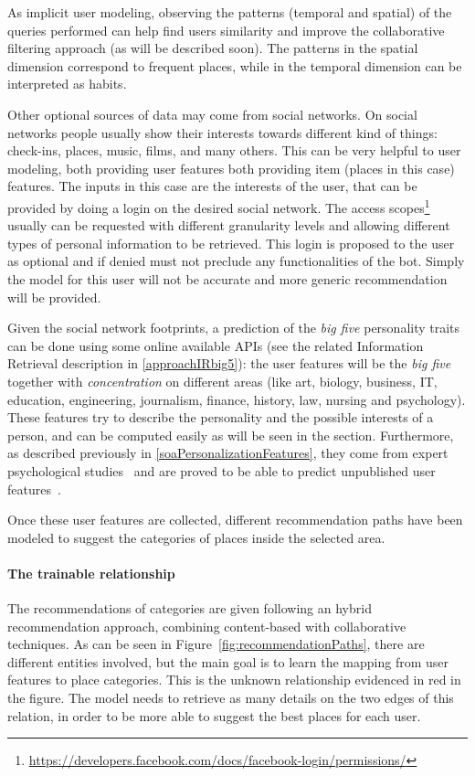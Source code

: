 As implicit user modeling, observing the patterns (temporal and spatial) of the queries performed can help find users similarity and improve the collaborative filtering approach (as will be described soon). The patterns in the spatial dimension correspond to frequent places, while in the temporal dimension can be interpreted as habits.

Other optional sources of data may come from social networks. On social networks people usually show their interests towards different kind of things: check-ins, places, music, films, and many others. This can be very helpful to user modeling, both providing user features both providing item (places in this case) features. The inputs in this case are the interests of the user, that can be provided by doing a login on the desired social network. The access scopes\footnote{\url{https://developers.facebook.com/docs/facebook-login/permissions/}} usually can be requested with different granularity levels and allowing different types of personal information to be retrieved. This login is proposed to the user as optional and if denied must not preclude any functionalities of the bot. Simply the model for this user will not be accurate and more generic recommendation will be provided.

Given the social network footprints, a prediction of the \textit{big five} personality traits can be done using some online available APIs (see the related Information Retrieval description in \ref{approachIRbig5}): the user features will be the \textit{big five} together with \textit{concentration} on different areas (like art, biology, business, IT, education, engineering, journalism, finance, history, law, nursing and psychology). These features try to describe the personality and the possible interests of a person, and can be computed easily as will be seen in the section. Furthermore, as described previously in \ref{soaPersonalizationFeatures}, they come from expert psychological studies~\cite{costa2008revised} and are proved to be able to predict unpublished user features~\cite{kosinski2013private}.

Once these user features are collected, different recommendation paths have been modeled to suggest the categories of places inside the selected area.

\paragraph{The trainable relationship}
The recommendations of categories are given following an hybrid recommendation approach, combining content-based with collaborative techniques. As can be seen in Figure~\ref{fig:recommendationPaths}, there are different entities involved, but the main goal is to learn the mapping from user features to place categories. This is the unknown relationship evidenced in red in the figure. The model needs to retrieve as many details on the two edges of this relation, in order to be more able to suggest the best places for each user.

